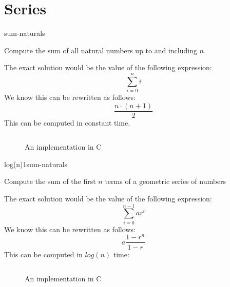 \documentclass[main.tex]{subfiles}
\begin{document}
\chapter{Series}

\begin{libraryfile}
  \begin{algorithm}{1}{1}{sum-naturals}
    \begin{algorithm-description}
      Compute the sum of all natural numbers up to and including $n$.
    \end{algorithm-description}
    \begin{algorithm-explanation}
      The exact solution would be the value of the following expression:
      \[ \sum_{i=0}^{n}i \]
      We know this can be rewritten as follows:
      \[ \frac{n\cdot(n+1)}{2} \]
      This can be computed in constant time.
      \begin{figure}[H]
        \centering
        \inputminted[firstline=5, lastline=7]{c}{\lib{c}{series.c}}
        \caption{An implementation in C}
      \end{figure}
    \end{algorithm-explanation}
  \end{algorithm}

  \begin{algorithm}{log(n)}{1}{sum-naturals}
    \begin{algorithm-description}
      Compute the sum of the first $n$ terms of a geometric series of numbers
    \end{algorithm-description}
    \begin{algorithm-explanation}
      The exact solution would be the value of the following expression:
      \[ \sum_{i=0}^{n-1}ar^{i} \]
      We know this can be rewritten as follows:
      \[ a\frac{1 - r^{n}}{1 - r} \]
      This can be computed in $log(n)$ time:
      \begin{figure}[H]
        \centering
        \inputminted[firstline=10, lastline=12]{c}{\lib{c}{series.c}}
        \caption{An implementation in C}
      \end{figure}
    \end{algorithm-explanation}
  \end{algorithm}
\end{libraryfile}
\end{document}

